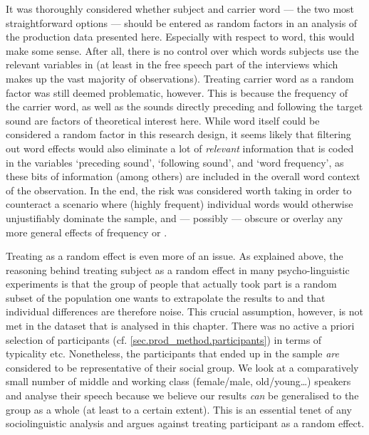 It was thoroughly considered whether subject and carrier word --- the two most straightforward options --- should be entered as random factors in an analysis of the production data presented here.
Especially with respect to word, this would make some sense.
After all, there is no control over which words subjects use the relevant variables in (at least in the free speech part of the interviews which makes up the vast majority of observations).
Treating carrier word as a random factor was still deemed problematic, however.
This is because the frequency of the carrier word, as well as the sounds directly preceding and following the target sound are factors of theoretical interest here.
While word itself could be considered a random factor in this research design, it seems likely that filtering out word effects would also eliminate a lot of \emph{relevant} information that is coded in the variables `preceding sound', `following sound', and `word frequency', as these bits of information (among others) are included in the overall word context of the observation.
In the end, the risk was considered worth taking in order to counteract a scenario where (highly frequent) individual words would otherwise unjustifiably dominate the sample, and --- possibly --- obscure or overlay any more general effects of frequency or .

Treating  as a random effect is even more of an issue.
As explained above, the reasoning behind treating subject as a random effect in many psycho-linguistic experiments is that the group of people that actually took part is a random subset of the population one wants to extrapolate the results to and that individual differences are therefore noise.
This crucial assumption, however, is not met in the dataset that is analysed in this chapter.
There was no active a priori selection of participants (cf. \ref{sec.prod_method.participants}) in terms of typicality etc.
Nonetheless, the participants that ended up in the sample \emph{are} considered to be representative of their social group.
We look at a comparatively small number of middle and working class (female/male, old/young\ldots) speakers and analyse their speech because we believe our results \emph{can} be generalised to the group as a whole (at least to a certain extent).
This is an essential tenet of any sociolinguistic analysis and argues against treating participant as a random effect.

